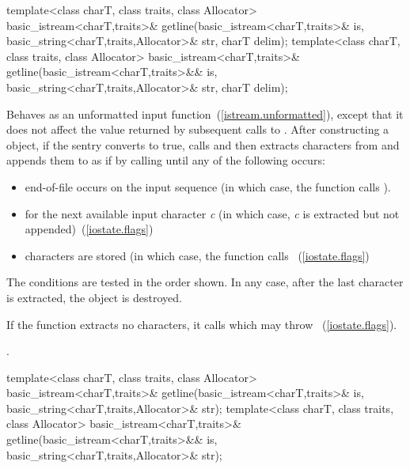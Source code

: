 %
%
\begin{itemdecl}
template<class charT, class traits, class Allocator>
  basic_istream<charT,traits>&
    getline(basic_istream<charT,traits>& is,
            basic_string<charT,traits,Allocator>& str,
            charT delim);
template<class charT, class traits, class Allocator>
  basic_istream<charT,traits>&
    getline(basic_istream<charT,traits>&& is,
            basic_string<charT,traits,Allocator>& str,
            charT delim);
\end{itemdecl}

\begin{itemdescr}
\pnum
\effects
Behaves as an unformatted input function~(\ref{istream.unformatted}),
except that it does not affect the value returned by subsequent calls to
.
After constructing a
object, if the sentry converts to true, calls
and then extracts characters from  and appends them
to  as if by calling
until any of the following occurs:

\begin{itemize}
\item
end-of-file occurs on the input sequence
(in which case, the
function calls
).
\item
{}
for the next available input character
\textit{c}
(in which case,
\textit{c}
is extracted but not appended)~(\ref{iostate.flags})
\item
{}
characters are stored
(in which case,
the function calls
~(\ref{iostate.flags})
\end{itemize}

\pnum
The conditions are tested in the order shown.
In any case,
after the last character is extracted, the
object 
is destroyed.

\pnum
If the function extracts no characters, it calls
which may throw
~(\ref{iostate.flags}).

\pnum
\returns
{}.
\end{itemdescr}

%
%
\begin{itemdecl}
template<class charT, class traits, class Allocator>
  basic_istream<charT,traits>&
    getline(basic_istream<charT,traits>& is,
            basic_string<charT,traits,Allocator>& str);
template<class charT, class traits, class Allocator>
  basic_istream<charT,traits>&
    getline(basic_istream<charT,traits>&& is,
            basic_string<charT,traits,Allocator>& str);
\end{itemdecl}

